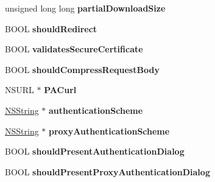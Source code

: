 \begin{DoxyCompactItemize}
\item 
\hypertarget{interface_a_s_i_h_t_t_p_request_a96c5caebaee3a0938e908dd32f29e3b9}{
unsigned long long {\bfseries partialDownloadSize}}
\label{interface_a_s_i_h_t_t_p_request_a96c5caebaee3a0938e908dd32f29e3b9}

\item 
\hypertarget{interface_a_s_i_h_t_t_p_request_a67392d144f0b29b4af5e478867ab7210}{
BOOL {\bfseries shouldRedirect}}
\label{interface_a_s_i_h_t_t_p_request_a67392d144f0b29b4af5e478867ab7210}

\item 
\hypertarget{interface_a_s_i_h_t_t_p_request_af4c82331697b93f1356f69e382e81dd2}{
BOOL {\bfseries validatesSecureCertificate}}
\label{interface_a_s_i_h_t_t_p_request_af4c82331697b93f1356f69e382e81dd2}

\item 
\hypertarget{interface_a_s_i_h_t_t_p_request_a5caebf9227ad199bf7c5fe9439df315c}{
BOOL {\bfseries shouldCompressRequestBody}}
\label{interface_a_s_i_h_t_t_p_request_a5caebf9227ad199bf7c5fe9439df315c}

\item 
\hypertarget{interface_a_s_i_h_t_t_p_request_a288caa55750fb0470a766ad46771b036}{
NSURL $\ast$ {\bfseries PACurl}}
\label{interface_a_s_i_h_t_t_p_request_a288caa55750fb0470a766ad46771b036}

\item 
\hypertarget{interface_a_s_i_h_t_t_p_request_af720d24bc1e2e48f8ecdd6e0b0bef1f5}{
\hyperlink{class_n_s_string}{NSString} $\ast$ {\bfseries authenticationScheme}}
\label{interface_a_s_i_h_t_t_p_request_af720d24bc1e2e48f8ecdd6e0b0bef1f5}

\item 
\hypertarget{interface_a_s_i_h_t_t_p_request_ac0a0e9653ee85171666515454fcc69f4}{
\hyperlink{class_n_s_string}{NSString} $\ast$ {\bfseries proxyAuthenticationScheme}}
\label{interface_a_s_i_h_t_t_p_request_ac0a0e9653ee85171666515454fcc69f4}

\item 
\hypertarget{interface_a_s_i_h_t_t_p_request_a0d4ffdc7b8fab1b541a885ab3d07123f}{
BOOL {\bfseries shouldPresentAuthenticationDialog}}
\label{interface_a_s_i_h_t_t_p_request_a0d4ffdc7b8fab1b541a885ab3d07123f}

\item 
\hypertarget{interface_a_s_i_h_t_t_p_request_a89b7f56b45d6c2bb0d9a862025baa7e3}{
BOOL {\bfseries shouldPresentProxyAuthenticationDialog}}
\label{interface_a_s_i_h_t_t_p_request_a89b7f56b45d6c2bb0d9a862025baa7e3}


\end{DoxyCompactItemize}
